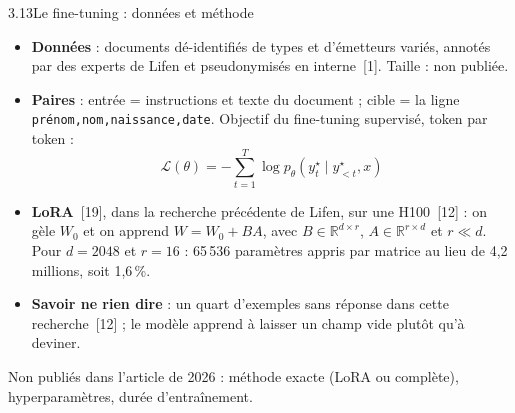 \documentclass[11pt,aspectratio=169]{beamer}
\newcommand{\refs}[1]{{\color{mlblue}[#1]}}
\newcommand{\pct}[1]{#1\,\%}
\newcommand{\tok}[1]{\foreignlanguage{english}{\texttt{#1}}}
\newcommand{\remarque}[1]{{\footnotesize\color{mlgray}#1\par}}
\begin{document}
\begin{frame}{3.13\quad Le fine-tuning : données et méthode}
  \small
  \begin{itemize}\setlength{\itemsep}{2pt}
    \item \textbf{Données} : documents dé-identifiés de types et d'émetteurs variés, annotés
      par des experts de Lifen et pseudonymisés en interne~\refs{1}. Taille : non publiée.
    \item \textbf{Paires} : entrée = instructions et texte du document ; cible = la ligne
      \tok{prénom,nom,naissance,date}. Objectif du fine-tuning supervisé, token par token :
      \[
        \mathcal{L}(\theta) = -\sum_{t=1}^{T} \log p_\theta\!\left(y^\star_t \mid y^\star_{<t}, x\right)
      \]
    \item \textbf{LoRA}~\refs{19}, dans la recherche précédente de Lifen, sur une
      H100~\refs{12} : on gèle $W_0$ et on apprend $W = W_0 + BA$, avec
      $B \in \mathbb{R}^{d \times r}$, $A \in \mathbb{R}^{r \times d}$ et $r \ll d$. Pour
      $d = 2048$ et $r = 16$ : 65\,536 paramètres appris par matrice au lieu de 4,2 millions,
      soit \pct{1,6}.
    \item \textbf{Savoir ne rien dire} : un quart d'exemples sans réponse dans cette
      recherche~\refs{12} ; le modèle apprend à laisser un champ vide plutôt qu'à deviner.
  \end{itemize}
  \remarque{Non publiés dans l'article de 2026 : méthode exacte (LoRA ou complète),
  hyperparamètres, durée d'entraînement.}
\end{frame}
\end{document}
